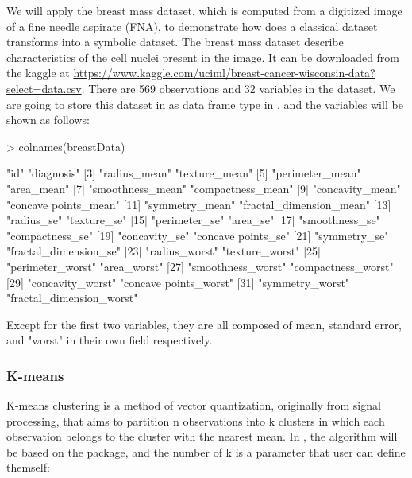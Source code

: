 \documentclass[article]{jss}
\begin{document}
We will apply the breast mass dataset, which is computed from a digitized image of a fine needle aspirate (FNA), to demonstrate how does a classical dataset transforms into a symbolic dataset. The breast mass dataset describe characteristics of the cell nuclei present in the image. It can be downloaded from the kaggle at \url{https://www.kaggle.com/uciml/breast-cancer-wisconsin-data?select=data.csv}. There are 569 observations and 32 variables in the dataset. We are going to store this dataset in  as data frame type in , and the variables will be shown as follows:
\begin{Schunk}
\begin{Sinput}
> colnames(breastData)
\end{Sinput}
\begin{Soutput}
 [1] "id"                      "diagnosis"              
 [3] "radius_mean"             "texture_mean"           
 [5] "perimeter_mean"          "area_mean"              
 [7] "smoothness_mean"         "compactness_mean"       
 [9] "concavity_mean"          "concave points_mean"    
[11] "symmetry_mean"           "fractal_dimension_mean" 
[13] "radius_se"               "texture_se"             
[15] "perimeter_se"            "area_se"                
[17] "smoothness_se"           "compactness_se"         
[19] "concavity_se"            "concave points_se"      
[21] "symmetry_se"             "fractal_dimension_se"   
[23] "radius_worst"            "texture_worst"          
[25] "perimeter_worst"         "area_worst"             
[27] "smoothness_worst"        "compactness_worst"      
[29] "concavity_worst"         "concave points_worst"   
[31] "symmetry_worst"          "fractal_dimension_worst"
\end{Soutput}
\end{Schunk}

Except for the first two variables, they are all composed of mean, standard error, and "worst" in their own field respectively.

\subsubsection{K-means}

K-means clustering is a method of vector quantization, originally from signal processing, that aims to partition n observations into k clusters in which each observation belongs to the cluster with the nearest mean. In , the algorithm will be based on the  package, and the number of k is a parameter that user can define themself:
\end{document}
